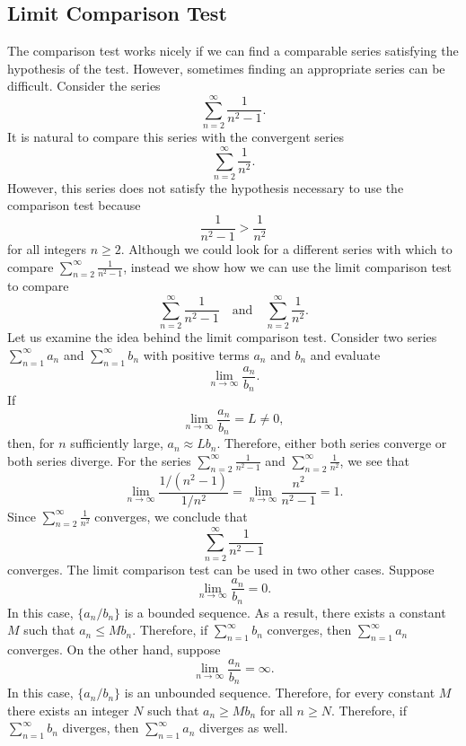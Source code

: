\documentclass{report}
\begin{document}
    \subsection*{Limit Comparison Test}
    \bigbreak \noindent 
    The comparison test works nicely if we can find a comparable series satisfying the hypothesis of the test. However, sometimes finding an appropriate series can be difficult. Consider the series
    \[
    \sum_{n=2}^{\infty} \frac{1}{n^2 - 1}.
    \]
    It is natural to compare this series with the convergent series
    \[
    \sum_{n=2}^{\infty} \frac{1}{n^2}.
    \]
    However, this series does not satisfy the hypothesis necessary to use the comparison test because
    \[
    \frac{1}{n^2 - 1} > \frac{1}{n^2}
    \]
    for all integers \( n \geq 2 \). Although we could look for a different series with which to compare \( \sum_{n=2}^{\infty} \frac{1}{n^2 - 1} \), instead we show how we can use the limit comparison test to compare
    \[
    \sum_{n=2}^{\infty} \frac{1}{n^2 - 1} \quad \text{and} \quad \sum_{n=2}^{\infty} \frac{1}{n^2}.
    \]
    Let us examine the idea behind the limit comparison test. Consider two series \( \sum_{n=1}^{\infty} a_n \) and \( \sum_{n=1}^{\infty} b_n \) with positive terms \( a_n \) and \( b_n \) and evaluate
    \[
    \lim_{n \to \infty} \frac{a_n}{b_n}.
    \]
    If
    \[
    \lim_{n \to \infty} \frac{a_n}{b_n} = L \neq 0,
    \]
    then, for \( n \) sufficiently large, \( a_n \approx Lb_n \). Therefore, either both series converge or both series diverge. For the series \( \sum_{n=2}^{\infty} \frac{1}{n^2 - 1} \) and \( \sum_{n=2}^{\infty} \frac{1}{n^2} \), we see that
    \[
    \lim_{n \to \infty} \frac{1/(n^2 - 1)}{1/n^2} = \lim_{n \to \infty} \frac{n^2}{n^2 - 1} = 1.
    \]
    Since \( \sum_{n=2}^{\infty} \frac{1}{n^2} \) converges, we conclude that
    \[
    \sum_{n=2}^{\infty} \frac{1}{n^2 - 1}
    \]
    converges.
    \bigbreak \noindent 
    The limit comparison test can be used in two other cases. Suppose
    \[
    \lim_{n \to \infty} \frac{a_n}{b_n} = 0.
    \]
    In this case, \( \{ a_n/b_n \} \) is a bounded sequence. As a result, there exists a constant \( M \) such that \( a_n \leq M b_n \). Therefore, if \( \sum_{n=1}^{\infty} b_n \) converges, then \( \sum_{n=1}^{\infty} a_n \) converges. On the other hand, suppose
    \[
    \lim_{n \to \infty} \frac{a_n}{b_n} = \infty.
    \]
    In this case, \( \{ a_n/b_n \} \) is an unbounded sequence. Therefore, for every constant \( M \) there exists an integer \( N \) such that \( a_n \geq M b_n \) for all \( n \geq N \). Therefore, if \( \sum_{n=1}^{\infty} b_n \) diverges, then \( \sum_{n=1}^{\infty} a_n \) diverges as well.
\end{document}
